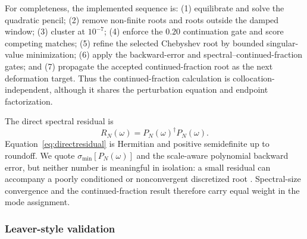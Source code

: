 \documentclass[12pt,a4paper]{article}
\begin{document}
For completeness, the implemented sequence is: (1) equilibrate and solve the quadratic
pencil; (2) remove non-finite roots and roots outside the damped window;
(3) cluster at \(10^{-7}\); (4) enforce the \(0.20\) continuation gate and
score competing matches; (5) refine the selected Chebyshev root by bounded
singular-value minimization; (6) apply the backward-error and
spectral--continued-fraction gates; and (7) propagate the accepted
continued-fraction root as the next deformation target.  Thus the
continued-fraction calculation is collocation-independent, although it shares
the perturbation equation and endpoint factorization.

The direct spectral residual is
\begin{equation}
R_N(\omega)=P_N(\omega)^\dagger P_N(\omega).
\label{eq:directresidual}
\end{equation}
Equation~\eqref{eq:directresidual} is Hermitian and positive semidefinite up to
roundoff. We quote \(\sigma_{\min}[P_N(\omega)]\) and the scale-aware polynomial
backward error, but neither number is meaningful in isolation: a small residual
can accompany a poorly conditioned or nonconvergent discretized root
\cite{Sadkane2023}. Spectral-size convergence and the continued-fraction result
therefore carry equal weight in the mode assignment.

\subsubsection{Leaver-style validation}
\end{document}
